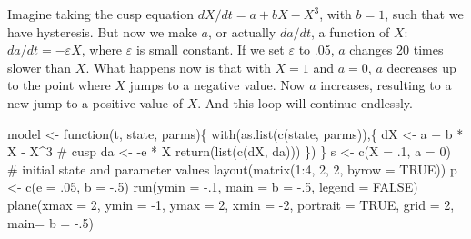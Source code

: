 \documentclass[
  a4paper,
  DIV=11,
  numbers=noendperiod,
  oneside]{scrreprt}
\newenvironment{Shaded}{}{}
\newcommand{\AttributeTok}[1]{\textcolor[rgb]{0.84,0.23,0.29}{#1}}
\newcommand{\CommentTok}[1]{\textcolor[rgb]{0.42,0.45,0.49}{#1}}
\newcommand{\ConstantTok}[1]{\textcolor[rgb]{0.00,0.36,0.77}{#1}}
\newcommand{\ControlFlowTok}[1]{\textcolor[rgb]{0.84,0.23,0.29}{#1}}
\newcommand{\DecValTok}[1]{\textcolor[rgb]{0.00,0.36,0.77}{#1}}
\newcommand{\FunctionTok}[1]{\textcolor[rgb]{0.44,0.26,0.76}{#1}}
\newcommand{\NormalTok}[1]{\textcolor[rgb]{0.14,0.16,0.18}{#1}}
\newcommand{\OtherTok}[1]{\textcolor[rgb]{0.44,0.26,0.76}{#1}}
\newcommand{\SpecialCharTok}[1]{\textcolor[rgb]{0.00,0.36,0.77}{#1}}
\newcommand{\StringTok}[1]{\textcolor[rgb]{0.01,0.18,0.38}{#1}}
\begin{document}
Imagine taking the cusp equation \(dX/dt = {a + bX - X}^{3}\), with
\(b=1\), such that we have hysteresis. But now we make \(a\), or
actually \(da/dt\), a function of \(X\): \(da/dt = - \varepsilon X\),
where \(\varepsilon\) is small constant. If we set \(\varepsilon\) to
.05, \(a\) changes 20 times slower than \(X\). What happens now is that
with \(X = 1\) and \(a = 0\), \(a\) decreases up to the point where
\(X\) jumps to a negative value. Now \(a\) increases, resulting to a new
jump to a positive value of \(X\). And this loop will continue
endlessly.

\begin{Shaded}
\begin{Highlighting}[]
\NormalTok{model }\OtherTok{\textless{}{-}} \ControlFlowTok{function}\NormalTok{(t, state, parms)\{}
  \FunctionTok{with}\NormalTok{(}\FunctionTok{as.list}\NormalTok{(}\FunctionTok{c}\NormalTok{(state, parms)),\{}
\NormalTok{    dX }\OtherTok{\textless{}{-}}\NormalTok{  a }\SpecialCharTok{+}\NormalTok{ b }\SpecialCharTok{*}\NormalTok{ X }\SpecialCharTok{{-}}\NormalTok{ X}\SpecialCharTok{\^{}}\DecValTok{3} \CommentTok{\# cusp}
\NormalTok{    da }\OtherTok{\textless{}{-}} \SpecialCharTok{{-}}\NormalTok{e }\SpecialCharTok{*}\NormalTok{ X}
    \FunctionTok{return}\NormalTok{(}\FunctionTok{list}\NormalTok{(}\FunctionTok{c}\NormalTok{(dX, da)))}
\NormalTok{  \})}
\NormalTok{\}}
\NormalTok{s }\OtherTok{\textless{}{-}} \FunctionTok{c}\NormalTok{(}\AttributeTok{X =}\NormalTok{ .}\DecValTok{1}\NormalTok{, }\AttributeTok{a =} \DecValTok{0}\NormalTok{) }\CommentTok{\# initial state and parameter values}
\FunctionTok{layout}\NormalTok{(}\FunctionTok{matrix}\NormalTok{(}\DecValTok{1}\SpecialCharTok{:}\DecValTok{4}\NormalTok{, }\DecValTok{2}\NormalTok{, }\DecValTok{2}\NormalTok{, }\AttributeTok{byrow =} \ConstantTok{TRUE}\NormalTok{))}
\NormalTok{p }\OtherTok{\textless{}{-}} \FunctionTok{c}\NormalTok{(}\AttributeTok{e =}\NormalTok{ .}\DecValTok{05}\NormalTok{, }\AttributeTok{b =} \SpecialCharTok{{-}}\NormalTok{.}\DecValTok{5}\NormalTok{)}
\FunctionTok{run}\NormalTok{(}\AttributeTok{ymin =} \SpecialCharTok{{-}}\NormalTok{.}\DecValTok{1}\NormalTok{, }\AttributeTok{main =} \StringTok{\textquotesingle{}b = {-}.5\textquotesingle{}}\NormalTok{, }\AttributeTok{legend =} \ConstantTok{FALSE}\NormalTok{)}
\FunctionTok{plane}\NormalTok{(}\AttributeTok{xmax =} \DecValTok{2}\NormalTok{, }\AttributeTok{ymin =} \SpecialCharTok{{-}}\DecValTok{1}\NormalTok{, }\AttributeTok{ymax =} \DecValTok{2}\NormalTok{, }\AttributeTok{xmin =} \SpecialCharTok{{-}}\DecValTok{2}\NormalTok{,}
      \AttributeTok{portrait =} \ConstantTok{TRUE}\NormalTok{, }\AttributeTok{grid =} \DecValTok{2}\NormalTok{, }\AttributeTok{main=} \StringTok{\textquotesingle{}b = {-}.5\textquotesingle{}}\NormalTok{)}

\end{Highlighting}
\end{Shaded}
\end{document}
